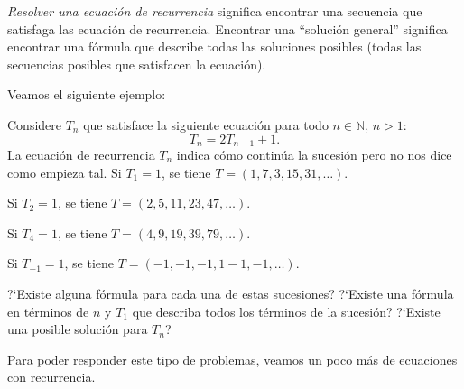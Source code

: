 \textit{Resolver una ecuación de recurrencia} significa encontrar una secuencia que satisfaga las ecuación de recurrencia. Encontrar una ``solución general'' significa encontrar una fórmula que describe todas las soluciones posibles (todas las secuencias posibles que satisfacen la ecuación).

Veamos el siguiente ejemplo:

Considere $T_{n}$ que satisface la siguiente ecuación para todo $n\in\mathds{N}$, $n>1$:
\begin{equation*}
	T_{n}=2T_{n-1}+1.
\end{equation*}
La ecuación de recurrencia $T_{n}$ indica cómo continúa la sucesión pero no nos dice como empieza tal.
Si $T_{1}=1$, se tiene $T=\left(1,7,3,15,31,\ldots\right)$.

Si $T_{2}=1$, se tiene $T=\left(2,5,11,23,47,\ldots\right)$.

Si $T_{4}=1$, se tiene $T=\left(4,9,19,39,79,\ldots\right)$.

Si $T_{-1}=1$, se tiene $T=\left(-1,-1,-1,1-1,-1,\ldots\right)$.

?`Existe alguna fórmula para cada una de estas sucesiones? ?`Existe una fórmula en términos de $n$ y $T_{1}$ que describa todos los términos de la sucesión? ?`Existe una posible solución para $T_{n}$?

Para poder responder este tipo de problemas, veamos un poco más de ecuaciones con recurrencia.

